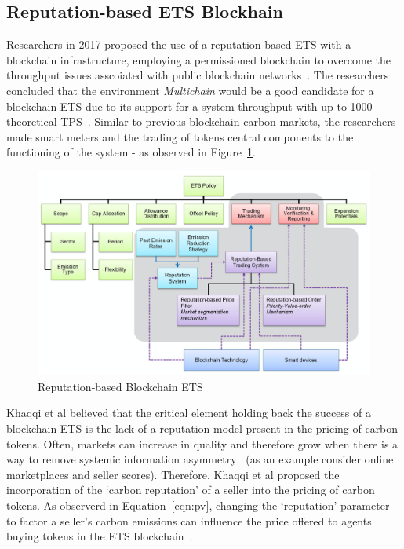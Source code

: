 \subsection{Reputation-based ETS Blockhain}

Researchers in 2017 proposed the use of a reputation-based
ETS with a blockchain infrastructure,
employing a permissioned blockchain to overcome
the throughput issues asscoiated with public
blockchain networks~\cite{KHAQQI20188}. The researchers concluded
that the environment \textit{Multichain} would be a good
candidate for a blockchain ETS due to its support for
a system throughput with up to 1000 theoretical TPS~\cite{KHAQQI20188}. Similar to
previous blockchain carbon markets, the researchers made smart
meters and the trading of tokens
central components to the functioning of
the system - as observed in Figure~\ref{fig:rep}.

\begin{figure}[H]
    \centering
    \includegraphics[scale=0.37]{photos/reputation.png}
    \caption{Reputation-based Blockchain ETS}
    \label{fig:rep}
\end{figure}

Khaqqi et al believed that the critical element holding back
the success of a blockchain ETS is the lack of a reputation
model present in the pricing of carbon tokens. Often,
markets can increase in quality and therefore grow when there is a way
to remove systemic information asymmetry~\cite{KHAQQI20188}
(as an example consider online marketplaces and seller scores).
Therefore, Khaqqi et al proposed the incorporation of the
`carbon reputation' of a seller into the pricing of carbon tokens.
As observerd in Equation~\ref{eqn:pv}, changing the `reputation'
parameter to factor a seller's carbon emissions can influence the price
offered to agents buying tokens in the
ETS blockchain~\cite{KHAQQI20188}.

